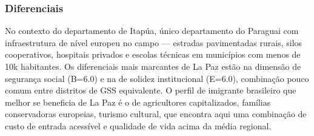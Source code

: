 \subsubsection*{Diferenciais}\label{dif-la-paz-0726}
No contexto do departamento de Itapúa, único departamento do Paraguai com infraestrutura de nível europeu no campo — estradas pavimentadas rurais, silos cooperativos, hospitais privados e escolas técnicas em municípios com menos de 10k habitantes. Os diferenciais mais marcantes de La Paz estão na dimensão de segurança social (B=6.0) e na de solidez institucional (E=6.0), combinação pouco comum entre distritos de GSS equivalente. O perfil de imigrante brasileiro que melhor se beneficia de La Paz é o de agricultores capitalizados, famílias conservadoras europeias, turismo cultural, que encontra aqui uma combinação de custo de entrada acessível e qualidade de vida acima da média regional.
